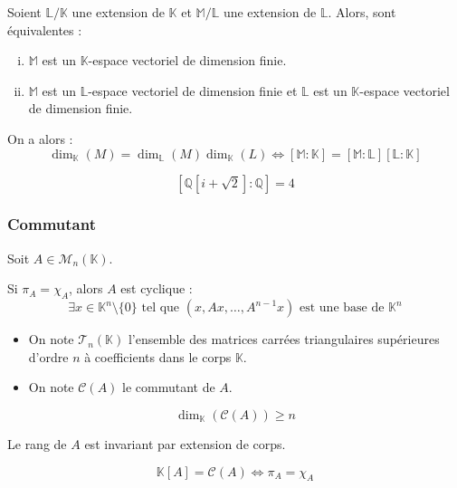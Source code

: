 	\begin{corollary}
		Soient $\mathbb{L}/\mathbb{K}$ une extension de $\mathbb{K}$ et $\mathbb{M}/\mathbb{L}$ une extension de $\mathbb{L}$. Alors, sont équivalentes :
		\begin{enumerate}[(i)]
			\item $\mathbb{M}$ est un $\mathbb{K}$-espace vectoriel de dimension finie.
			\item $\mathbb{M}$ est un $\mathbb{L}$-espace vectoriel de dimension finie et $\mathbb{L}$ est un $\mathbb{K}$-espace vectoriel de dimension finie.
		\end{enumerate}
		On a alors :
		\[ \dim_{\mathbb{K}}(M) = \dim_{\mathbb{L}}(M) \dim_{\mathbb{K}}(L) \iff [\mathbb{M}:\mathbb{K}] = [\mathbb{M}:\mathbb{L}] [\mathbb{L}:\mathbb{K}] \]
	\end{corollary}


	\begin{example}
		\[ [\mathbb{Q}[i + \sqrt{2}]:\mathbb{Q}] = 4 \]
	\end{example}

	\subsubsection{Commutant}

	Soit $A \in \mathcal{M}_n(\mathbb{K})$.


	\begin{lemma}
		Si $\pi_A = \chi_A$, alors $A$ est cyclique :
		\[ \exists x \in \mathbb{K}^n \setminus \{ 0 \} \text{ tel que } (x, Ax, \dots, A^{n-1}x) \text{ est une base de } \mathbb{K}^n \]
	\end{lemma}


	\begin{notation}
		\begin{itemize}
			\item On note $\mathcal{T}_n(\mathbb{K})$ l'ensemble des matrices carrées triangulaires supérieures d'ordre $n$ à coefficients dans le corps $\mathbb{K}$.
			\item On note $\mathcal{C}(A)$ le commutant de $A$.
		\end{itemize}
	\end{notation}

	\begin{lemma}
		\[ \dim_{\mathbb{K}}(\mathcal{C}(A)) \geq n \]
	\end{lemma}

	\begin{lemma}
		Le rang de $A$ est invariant par extension de corps.
	\end{lemma}


	\begin{theorem}
		\[ \mathbb{K}[A] = \mathcal{C}(A) \iff \pi_A = \chi_A \]
	\end{theorem}

